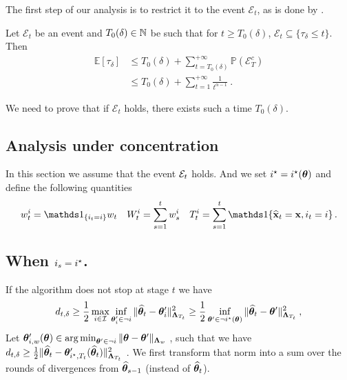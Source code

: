 The first step of our analysis is to restrict it to the event $\mathcal E_t$, as is done by \citet{garivier2016tracknstop,degenne2019game}.
\begin{lemma}
Let $\mathcal E_t$ be an event and $T_0(\delta) \in {\mathbb N}$ be such that for $t\ge T_0(\delta)$, $\mathcal E_t \subseteq \{\tau_\delta \le t\}$. Then
\begin{align*}
\mathbb{E}[\tau_\delta]
&\le T_0(\delta) + \sum_{t=T_0(\delta)}^{+\infty} \mathbb{P}(\mathcal E_T^c)
\\
&\le T_0(\delta) + \sum_{t=1}^{+\infty} \frac{1}{t^{\alpha-1}}\: .
\end{align*}
\end{lemma}

We need to prove that if $\mathcal E_t$ holds, there exists such a time $T_0(\delta)$.

\subsection{Analysis under concentration}
In this section we assume that the event $\mathcal{E}_t$ holds. And we set $i^\star=i^\star({\boldsymbol \theta})$ and define the following quantities
\[
w_t^i = \ind_{\{i_t = i\}}w_t \quad W_t^i = \sum_{s=1}^t w_s^i\quad T_t^i = \sum_{s=1}^t \ind{\{\hbx_t=\bx,i_t=i\}}\,.
\]

\subsection{When $i_s = i^\star$.}
If the algorithm does not stop at stage $t$
we have
\begin{align*}
d_{t,\delta}
\ge \frac{1}{2}\max_{i\in\mathcal{I}} \inf_{{\boldsymbol \theta}'_i \in \neg i}\Vert \widehat{{\boldsymbol \theta}}_t - {\boldsymbol \theta}'_i \Vert_{{\boldsymbol \Lambda}_{T_t}}^2
\geq  \frac{1}{2} \inf_{{\boldsymbol \theta}' \in \neg i^\star({\boldsymbol \theta})}\Vert \widehat{{\boldsymbol \theta}}_t - {\boldsymbol \theta}' \Vert_{{\boldsymbol \Lambda}_{T_t}}^2
\: ,
\end{align*}
Let ${\boldsymbol \theta}'_{i,w}({\boldsymbol \theta}) \in \operatorname*{arg\,min}_{{\boldsymbol \theta}' \in \neg i} \Vert {\boldsymbol \theta} - {\boldsymbol \theta}' \Vert_{{\boldsymbol \Lambda}_{w}}$ , such that we have $d_{t,\delta} \ge \frac{1}{2}\Vert \widehat{{\boldsymbol \theta}}_t - {\boldsymbol \theta}'_{i^\star,T_t}(\widehat{{\boldsymbol \theta}}_t) \Vert_{{\boldsymbol \Lambda}_{T_t}}^2$ . We first transform that norm into a sum over the rounds of divergences from $\widehat{{\boldsymbol \theta}}_{s-1}$ (instead of $\widehat{{\boldsymbol \theta}}_t$).

